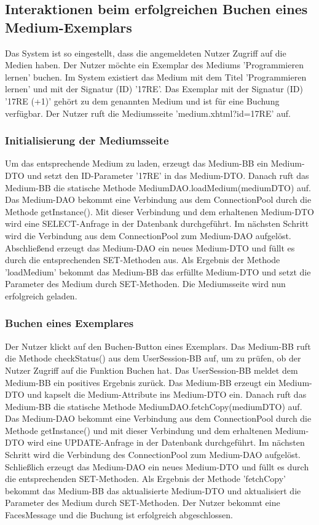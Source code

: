 \documentclass{article}
\begin{document}
\subsection{Interaktionen beim erfolgreichen Buchen eines Medium-Exemplars}
Das System ist so eingestellt, dass die angemeldeten Nutzer Zugriff auf die Medien haben. Der Nutzer möchte ein Exemplar des Mediums 'Programmieren lernen' buchen. Im System existiert das Medium mit dem Titel 'Programmieren lernen' und mit der Signatur (ID) '17RE'. Das Exemplar mit der Signatur (ID) '17RE (+1)' gehört zu dem genannten Medium und ist für eine Buchung verfügbar. Der Nutzer ruft die Mediumsseite 'medium.xhtml?id=17RE' auf.
\subsubsection{Initialisierung der Mediumsseite}
Um das entsprechende Medium zu laden, erzeugt das Medium-BB ein Medium-DTO und setzt den ID-Parameter '17RE' in das Medium-DTO. Danach ruft das Medium-BB die statische Methode MediumDAO.loadMedium(mediumDTO) auf. Das Medium-DAO bekommt eine Verbindung aus dem ConnectionPool durch die Methode getInstance(). Mit dieser Verbindung und dem erhaltenen Medium-DTO wird eine SELECT-Anfrage in der Datenbank durchgeführt. Im nächsten Schritt wird die Verbindung aus dem ConnectionPool zum Medium-DAO aufgelöst. Abschließend erzeugt das Medium-DAO ein neues Medium-DTO und füllt es durch die entsprechenden SET-Methoden aus. Als Ergebnis der Methode 'loadMedium' bekommt das Medium-BB das erfüllte Medium-DTO und setzt die Parameter des Medium durch SET-Methoden. Die Mediumsseite wird nun erfolgreich geladen.
\subsubsection{Buchen eines Exemplares}
Der Nutzer klickt auf den Buchen-Button eines Exemplars. Das Medium-BB ruft die Methode checkStatus() aus dem UserSession-BB auf, um zu prüfen, ob der Nutzer Zugriff auf die Funktion Buchen hat. Das UserSession-BB meldet dem Medium-BB ein positives Ergebnis zurück. Das Medium-BB erzeugt ein Medium-DTO und kapselt die Medium-Attribute ins Medium-DTO ein. Danach ruft das Medium-BB die statische Methode MediumDAO.fetchCopy(mediumDTO) auf. Das Medium-DAO bekommt eine Verbindung aus dem ConnectionPool durch die Methode getInstance() und mit dieser Verbindung und dem erhaltenen Medium-DTO wird eine UPDATE-Anfrage in der Datenbank durchgeführt. Im nächsten Schritt wird die Verbindung des ConnectionPool zum Medium-DAO aufgelöst. Schließlich erzeugt das Medium-DAO ein neues Medium-DTO und füllt es durch die entsprechenden SET-Methoden. Als Ergebnis der Methode 'fetchCopy' bekommt das Medium-BB das aktualisierte Medium-DTO und aktualisiert die Parameter des Medium durch SET-Methoden. Der Nutzer bekommt eine FacesMessage und die Buchung ist erfolgreich abgeschlossen.
\newpage
\end{document}
